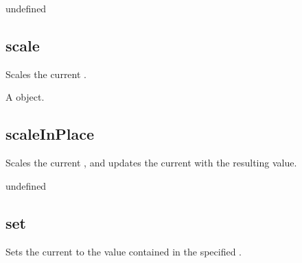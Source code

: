 \documentclass[letterpaper,12pt,english,openany,oneside]{sphinxmanual}
\begin{document}
undefined


\subsection{scale}
\label{\detokenize{JS_3D_API:scale-1}}\label{\detokenize{JS_3D_API:id47}}
Scales the current .

\label{\detokenize{JS_3D_API:syntax-138}}

\begin{sphinxVerbatim}[commandchars=\\\{\}]
\end{sphinxVerbatim}
\label{\detokenize{JS_3D_API:parameters-99}}

\label{\detokenize{JS_3D_API:section-137}}\label{\detokenize{JS_3D_API:returns-139}}

A  object.


\subsection{scaleInPlace}
\label{\detokenize{JS_3D_API:scaleinplace-1}}\label{\detokenize{JS_3D_API:id48}}
Scales the current  , and updates the current  with the resulting value.

\label{\detokenize{JS_3D_API:syntax-139}}

\begin{sphinxVerbatim}[commandchars=\\\{\}]
\end{sphinxVerbatim}
\label{\detokenize{JS_3D_API:parameters-100}}

\label{\detokenize{JS_3D_API:section-138}}\label{\detokenize{JS_3D_API:returns-140}}

undefined


\subsection{set}
\label{\detokenize{JS_3D_API:set-5}}\label{\detokenize{JS_3D_API:id49}}
Sets the current  to the value contained in the specified .
\end{document}
